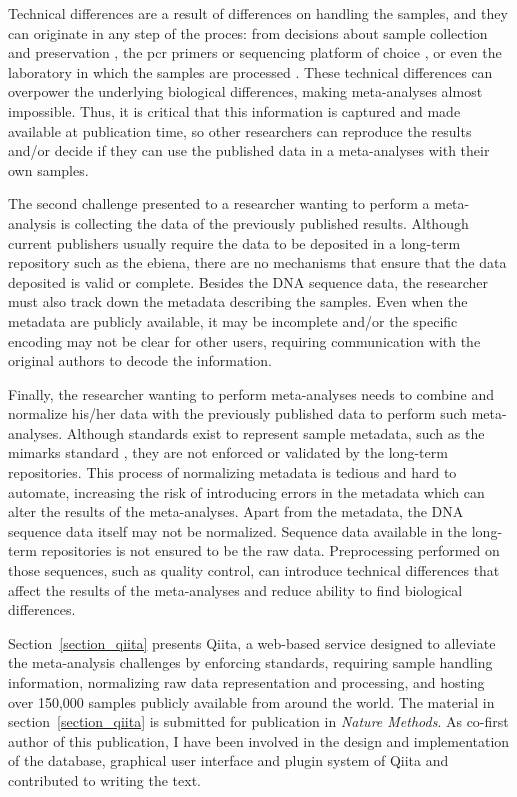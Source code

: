 \documentclass[12pt,chapterheads]{ucsd}
\begin{document}
Technical differences are a result of differences on handling the samples, and
they can originate in any step of the proces: from decisions about sample collection and
preservation \cite{Song2016}, the \gls{pcr} primers or sequencing platform of choice
\cite{Kuczynski2011, Tremblay2015}, or even the laboratory in which the samples
are processed \cite{Sinha2017}. These technical differences can overpower
the underlying biological differences, making meta-analyses almost impossible. Thus,
it is critical that this information is captured and made available at publication
time, so other researchers can reproduce the results and/or decide if they can use
the published data in a meta-analyses with their own samples.

The second challenge presented to a researcher wanting to perform a meta-analysis
is collecting the data of the previously published results. Although current publishers
usually require the data to be deposited in a long-term repository such as
the \gls{ebiena}, there are no mechanisms that ensure that the data deposited is valid
or complete. Besides the DNA sequence data, the researcher must also track down
the metadata describing the samples. Even when the metadata are publicly available,
it may be incomplete and/or the specific encoding may not
be clear for other users, requiring communication with the original authors to
decode the information.

Finally, the researcher wanting to perform meta-analyses needs to combine and normalize
his/her data with the previously published data to perform such meta-analyses.
Although standards exist to represent sample metadata, such as the \gls{mimarks} standard
\cite{Yilmaz2011}, they are not enforced or validated by the long-term repositories.
This process of normalizing metadata is tedious and hard to automate, increasing
the risk of introducing errors in the metadata which can alter the results
of the meta-analyses. Apart from the metadata, the DNA sequence data itself may
not be normalized. Sequence data available in the long-term repositories is not ensured
to be the raw data. Preprocessing performed on those
sequences, such as quality control, can introduce technical differences that affect
the results of the meta-analyses and reduce ability to find biological differences.

Section~\ref{section_qiita} presents Qiita, a web-based service designed to
alleviate the meta-analysis challenges by enforcing standards, requiring sample
handling information, normalizing raw data representation and processing, and hosting
over 150,000 samples publicly available from around the world. The material in section~\ref{section_qiita}
is submitted for publication in \textsl{Nature Methods}. As co-first
author of this publication, I have been involved in the design and implementation of
the database, graphical user interface and plugin system of Qiita and contributed
to writing the text.
\end{document}

